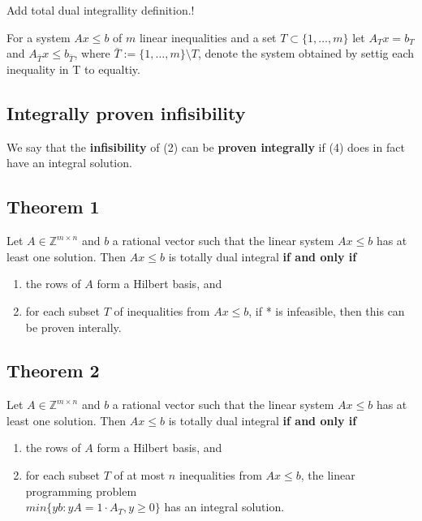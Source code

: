 \documentclass{article}
\begin{document}
Add total dual integrallity definition.!



For a system $Ax \leq b$ of $m$ linear inequalities and a set $T\subset \{1, \dots, m \}$ let $A_T x = b_T$ and $A_{\bar{T}} x \leq b_{\bar{T}}$, where $\bar{T} := \{1, \dots, m \} \setminus T$, denote the system obtained by settig each inequality in T to equaltiy.

\subsection*{Integrally proven infisibility}

We say that the \textbf{infisibility} of (2) can be \textbf{proven integrally} if (4) does in fact have an integral solution. 


\subsection*{Theorem 1}

Let $A\in \mathbb{Z}^{m \times n}$ and $b$ a rational vector such that the linear system $Ax \leq b$ has at least one solution. Then $Ax \leq b$ is totally dual integral \textbf{if and only if}

    \begin{enumerate}

        \item the rows of $A$ form a Hilbert basis, and

        \item for each subset $T$ of inequalities from $Ax\leq b$, if * is infeasible, then this can be proven interally.

    \end{enumerate}

\subsection*{Theorem 2}

Let $A\in \mathbb{Z}^{m \times n}$ and $b$ a rational vector such that the linear system $Ax \leq b$ has at least one solution. Then $Ax \leq b$ is totally dual integral \textbf{if and only if}

    \begin{enumerate}

        \item the rows of $A$ form a Hilbert basis, and

        \item for each subset $T$ of at most $n$ inequalities from $Ax\leq b$, the linear programming problem \\
        $min\{yb: yA=1\cdot A_T, y\geq 0 \}$ has an integral solution.

    \end{enumerate}
\end{document}
